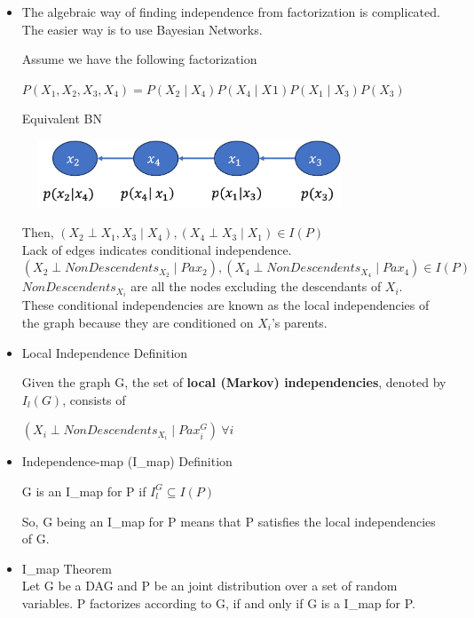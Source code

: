 \documentclass[11pt,a4paper]{report}
\begin{document}
\begin{itemize}
    \item The algebraic way of finding independence from factorization is complicated. The easier way is to use Bayesian Networks.

Assume we have the following factorization

\begin{center}
    $P(X_{1}, X_{2}, X_{3}, X_{4}) = P(X_{2} \mid X_{4})P(X_{4} \mid X_{}1)P(X_{1} \mid X_{3})P(X_{3})$ 
\end{center}

Equivalent BN

\begin{center}
    \includegraphics[width = 10cm, height = 2cm]{factor_ind.png}

    Then,
    $(X_{2} \perp X_{1}, X_{3} \mid X_{4}), (X_{4} \perp X_{3} \mid X_{1}) \in I(P)$ \\
    \vspace{0.3cm}
    Lack of edges indicates conditional independence. \\
    \vspace{0.3cm}
    $ (X_{2} \perp NonDescendents_{X_{2}} \mid Pax_{2}), (X_{4} \perp NonDescendents_{X_{4}} \mid Pax_{4}) \in I(P)$ \\
    $NonDescendents_{X_{i}}$ are all the nodes excluding the descendants of $X_{i}$.\\
    \vspace{0.3cm}
    These conditional independencies are known as the local independencies of the graph because they are conditioned on $X_{i}$'s parents.
\end{center}

\item Local Independence Definition

Given the graph G, the set of \textbf{local (Markov) independencies}, denoted by $I_{l}(G)$, consists of

\begin{center}
    $(X_{i} \perp NonDescendents_{X_{i}} \mid Pax_{i}^{G})\ \forall i$
\end{center}

\item Independence-map (I\_map) Definition

\begin{center}
    G is an I\_map for P if $I_{l}^{G} \subseteq I(P)$
\end{center}

So, G being an I\_map for P means that P satisfies the local independencies of G.

\item I\_map Theorem\\
Let G be a DAG and P be an joint distribution over a set of random variables. P factorizes according to G, if and only if G is a I\_map for P.

\end{itemize}
\end{document}
